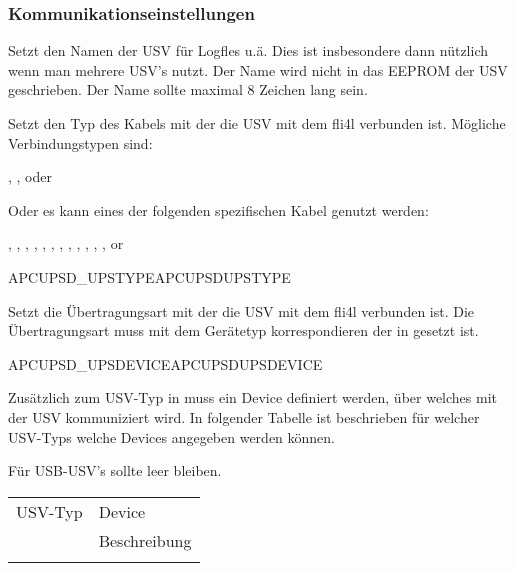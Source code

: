 \subsubsection {Kommunikationseinstellungen}
\begin{description}


  Setzt den Namen der USV für Logfles u.ä.
  Dies ist insbesondere dann nützlich wenn man mehrere USV's nutzt.
  Der Name wird nicht in das EEPROM der USV geschrieben.
  Der Name sollte maximal 8 Zeichen lang sein.


 
  Setzt den Typ des Kabels mit der die USV mit dem fli4l verbunden ist.
  Mögliche Verbindungstypen sind:

   , ,  oder 
  
  Oder es kann eines der folgenden spezifischen Kabel genutzt werden:

  , , , ,
  , , , ,
  , , , ,
  or 

 {APCUPSD\_UPSTYPE}{APCUPSDUPSTYPE}

  Setzt die Übertragungsart mit der die USV mit dem fli4l verbunden ist.
  Die Übertragungsart muss mit dem Gerätetyp korrespondieren der in 
   gesetzt ist. 

 {APCUPSD\_UPSDEVICE}{APCUPSDUPSDEVICE}

  Zusätzlich zum USV-Typ in  muss
  ein Device definiert werden, über welches mit der USV kommuniziert wird.
  In folgender Tabelle ist beschrieben für welcher USV-Typs welche Devices
  angegeben werden können. 
  
  Für USB-USV's sollte  leer bleiben.
   
\begin{tabular}{p{20mm}p{120mm}}
  USV-Typ & Device \\ & Beschreibung
  \\\\ 
  

\end{tabular}
\end{description}
